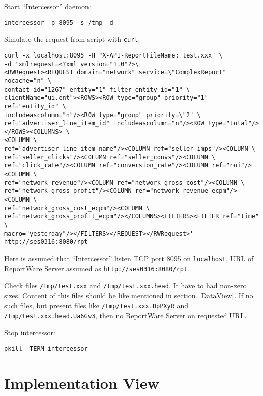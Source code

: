 \documentclass[a4paper,twoside]{article}
\newcommand{\Inter}{{\fontseries{b}\selectfont ``Intercessor''}}
\begin{document}
Start \Inter{} daemon:
\begin{verbatim}
intercessor -p 8095 -s /tmp -d
\end{verbatim}

Simulate the request from script with \verb|curl|:
\begin{verbatim}
curl -x localhost:8095 -H "X-API-ReportFileName: test.xxx" \
-d 'xmlrequest=<?xml version="1.0"?>\
<RWRequest><REQUEST domain="network" service=\"ComplexReport" nocache="n" \
contact_id="1267" entity="1" filter_entity_id="1" \
clientName="ui.ent"><ROWS><ROW type="group" priority="1" ref="entity_id" \
includeascolumn="n"/><ROW type="group" priority=\"2" \
ref="advertiser_line_item_id" includeascolumn="n"/><ROW type="total"/></ROWS><COLUMNS> \
<COLUMN \
ref="advertiser_line_item_name"/><COLUMN ref="seller_imps"/><COLUMN \
ref="seller_clicks"/><COLUMN ref="seller_convs"/><COLUMN \
ref="click_rate"/><COLUMN ref="conversion_rate"/><COLUMN ref="roi"/><COLUMN \
ref="network_revenue"/><COLUMN ref="network_gross_cost"/><COLUMN \
ref="network_gross_profit"/><COLUMN ref="network_revenue_ecpm"/><COLUMN \
ref="network_gross_cost_ecpm"/><COLUMN \
ref="network_gross_profit_ecpm"/></COLUMNS><FILTERS><FILTER ref="time" \
macro="yesterday"/></FILTERS></REQUEST></RWRequest>' http://ses0316:8080/rpt
\end{verbatim}
Here is assumed that \Inter{} listen TCP port 8095 on \verb|localhost|, URL of ReportWare Server assumed as \verb|http://ses0316:8080/rpt|.

Check files \verb|/tmp/test.xxx| and \verb|/tmp/test.xxx.head|. It have to had non-zero
sizes. Content of this files should be like mentioned in section~\ref{DataView}.
If no such files, but present files like \verb|/tmp/test.xxx.DpPXyR|
and \verb|/tmp/test.xxx.head.Ua6Gw3|, then no ReportWare Server on requested URL.

Stop intercessor:
\begin{verbatim}
pkill -TERM intercessor
\end{verbatim}

\section{Implementation View\label{ImplView}}

\end{document}
